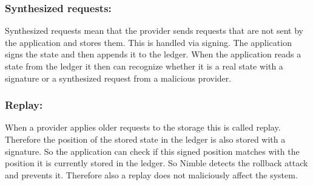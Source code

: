 	\subsubsection*{Synthesized requests:} Synthesized requests mean that the provider sends requests that are not sent by the application and stores them. This is handled via signing. The application signs the state and then appends it to the ledger. When the application reads a state from the ledger it then can recognize whether it is a real state with a signature or a synthesized request from a malicious provider.
	\subsubsection*{Replay:} When a provider applies older requests to the storage this is called replay. Therefore the position of the stored state in the ledger is also stored with a signature. So the application can check if this signed position matches with the position it is currently stored in the ledger. So Nimble detects the rollback attack and prevents it. Therefore also a replay does not maliciously affect the system.\\
	
